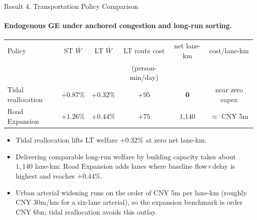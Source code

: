 \documentclass[11pt,aspectratio=169]{beamer}
\newcommand{\good}[1]{\textcolor{blue!70!black}{#1}}
\newcommand{\app}[1]{\allowbreak\hspace{0.25em}\hyperlink{#1}{\beamergotobutton{details}}}
\begin{document}
\begin{frame}[label=result4]{Result 4. Transportation Policy Comparison}
\framesubtitle{Endogenous GE under anchored congestion and long-run sorting.}
\begin{center}\scriptsize
\begin{tabular}{lccccc}
\toprule
Policy & ST $\bar W$ & LT $\bar W$ & LT route cost & net lane-km & cost/lane-km \\
 &  &  & (person-min/day) &  &  \\
\midrule
Tidal reallocation & $+0.87\%$ & $+0.32\%$ & $+95$ & \good{\textbf{0}} & near zero capex \\
Road Expansion & $+1.26\%$ & $+0.44\%$ & $+75$ & 1{,}140 & $\approx$ CNY 5m \\
\bottomrule
\end{tabular}
\end{center}
\vspace{0.3em}
\begin{itemize}\footnotesize
  \item Tidal reallocation lifts LT welfare $+0.32\%$ at zero net lane-km.
  \item Delivering comparable long-run welfare by building capacity takes about $1{,}140$ lane-km: Road Expansion adds lanes where baseline flow$\times$delay is highest and reaches $+0.44\%$.
  \item Urban arterial widening runs on the order of CNY 5m per lane-km (roughly CNY 30m/km for a six-lane arterial), so the expansion benchmark is order CNY 6bn; tidal reallocation avoids this outlay. \app{apppolicy}
\end{itemize}
\end{frame}
\end{document}
